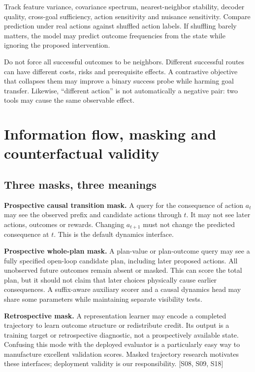 \documentclass[
  11pt,
  a4paper,
]{article}
\begin{document}
Track feature variance, covariance spectrum, nearest-neighbor stability,
decoder quality, cross-goal sufficiency, action sensitivity and nuisance
sensitivity. Compare prediction under real actions against shuffled
action labels. If shuffling barely matters, the model may predict
outcome frequencies from the state while ignoring the proposed
intervention.

Do not force all successful outcomes to be neighbors. Different
successful routes can have different costs, risks and prerequisite
effects. A contrastive objective that collapses them may improve a
binary success probe while harming goal transfer. Likewise, ``different
action'' is not automatically a negative pair: two tools may cause the
same observable effect.

\section{Information flow, masking and counterfactual
validity}\label{information-flow-masking-and-counterfactual-validity}

\subsection{Three masks, three
meanings}\label{three-masks-three-meanings}

\textbf{Prospective causal transition mask.} A query for the consequence
of action \(a_t\) may see the observed prefix and candidate actions
through \(t\). It may not see later actions, outcomes or rewards.
Changing \(a_{t+1}\) must not change the predicted consequence at \(t\).
This is the default dynamics interface.

\textbf{Prospective whole-plan mask.} A plan-value or plan-outcome query
may see a fully specified open-loop candidate plan, including later
proposed actions. All unobserved future outcomes remain absent or
masked. This can score the total plan, but it should not claim that
later choices physically cause earlier consequences. A suffix-aware
auxiliary scorer and a causal dynamics head may share some parameters
while maintaining separate visibility tests.

\textbf{Retrospective mask.} A representation learner may encode a
completed trajectory to learn outcome structure or redistribute credit.
Its output is a training target or retrospective diagnostic, not a
prospectively available state. Confusing this mode with the deployed
evaluator is a particularly easy way to manufacture excellent validation
scores. Masked trajectory research motivates these interfaces;
deployment validity is our responsibility. {[}S08, S09, S18{]}
\end{document}
